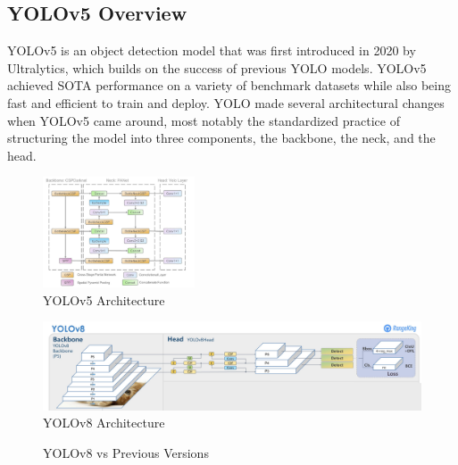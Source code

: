 \documentclass[10pt,twocolumn,letterpaper]{article}
\begin{document}
\subsection{YOLOv5 Overview}
YOLOv5 is an object detection model that was first introduced in 2020 by Ultralytics, which builds on the success of previous YOLO models. YOLOv5 achieved SOTA performance on a variety of benchmark datasets while also being fast and efficient to train and deploy. YOLO made several architectural changes when YOLOv5 came around, most notably the standardized practice of structuring the model into three components, the backbone, the neck, and the head.
\begin{figure}[h]
    \centering
    \includegraphics[width=0.4\textwidth]{figures/Yolov5Architecture.png}
    \caption{YOLOv5 Architecture \cite{Yolov5Arch}}
    \label{fig:Yolov5Architecture}
\end{figure}
\begin{figure}[h]
    \centering
    \includegraphics[width=1.0 \textwidth]{figures/YOLOv8_arch.png}
    \caption{YOLOv8 Architecture ~\cite{YOLOv8Website}}
    \label{fig:YOLOv8_arch}
\end{figure}
\begin{figure}[h]
    \centering
    \qquad
    \caption{YOLOv8 vs Previous Versions}%
    \label{fig:Model_Evaluation}
\end{figure}
\end{document}
